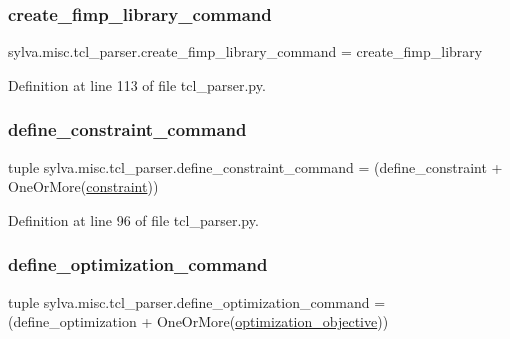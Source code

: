 \subsubsection{\texorpdfstring{create\+\_\+fimp\+\_\+library\+\_\+command}{create\_fimp\_library\_command}}
{\footnotesize\ttfamily sylva.\+misc.\+tcl\+\_\+parser.\+create\+\_\+fimp\+\_\+library\+\_\+command = create\+\_\+fimp\+\_\+library}



Definition at line 113 of file tcl\+\_\+parser.\+py.

\mbox{\label{namespacesylva_1_1misc_1_1tcl__parser_a6e28133e31ff032306235b32b0022359}} 
\subsubsection{\texorpdfstring{define\+\_\+constraint\+\_\+command}{define\_constraint\_command}}
{\footnotesize\ttfamily tuple sylva.\+misc.\+tcl\+\_\+parser.\+define\+\_\+constraint\+\_\+command = (define\+\_\+constraint + One\+Or\+More(\hyperlink{namespacesylva_1_1misc_1_1tcl__parser_aca4985821c9124374a17c708bfcf6277}{constraint}))}



Definition at line 96 of file tcl\+\_\+parser.\+py.

\mbox{\label{namespacesylva_1_1misc_1_1tcl__parser_a7d18cc1131533a809b16ee58f156c982}} 
\subsubsection{\texorpdfstring{define\+\_\+optimization\+\_\+command}{define\_optimization\_command}}
{\footnotesize\ttfamily tuple sylva.\+misc.\+tcl\+\_\+parser.\+define\+\_\+optimization\+\_\+command = (define\+\_\+optimization + One\+Or\+More(\hyperlink{namespacesylva_1_1misc_1_1tcl__parser_a2824099d1a0d1a85a6148e0b5fdc31e8}{optimization\+\_\+objective}))}



